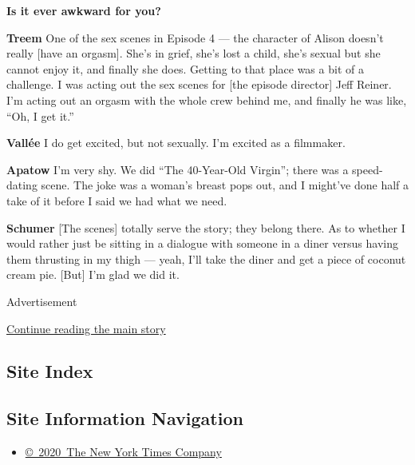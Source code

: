 \textbf{Is it ever awkward for you?}

\textbf{Treem} One of the sex scenes in Episode 4 --- the character of
Alison doesn't really {[}have an orgasm{]}. She's in grief, she's lost a
child, she's sexual but she cannot enjoy it, and finally she does.
Getting to that place was a bit of a challenge. I was acting out the sex
scenes for {[}the episode director{]} Jeff Reiner. I'm acting out an
orgasm with the whole crew behind me, and finally he was like, ``Oh, I
get it.''

\textbf{Vallée} I do get excited, but not sexually. I'm excited as a
filmmaker.

\textbf{Apatow} I'm very shy. We did ``The 40-Year-Old Virgin''; there
was a speed-dating scene. The joke was a woman's breast pops out, and I
might've done half a take of it before I said we had what we need.

\textbf{Schumer} {[}The scenes{]} totally serve the story; they belong
there. As to whether I would rather just be sitting in a dialogue with
someone in a diner versus having them thrusting in my thigh --- yeah,
I'll take the diner and get a piece of coconut cream pie. {[}But{]} I'm
glad we did it.

Advertisement

\protect\hyperlink{after-bottom}{Continue reading the main story}

\hypertarget{site-index}{%
\subsection{Site Index}\label{site-index}}

\hypertarget{site-information-navigation}{%
\subsection{Site Information
Navigation}\label{site-information-navigation}}

\begin{itemize}
\tightlist
\item
  \href{https://help.nytimes3xbfgragh.onion/hc/en-us/articles/115014792127-Copyright-notice}{©~2020~The
  New York Times Company}
\end{itemize}

